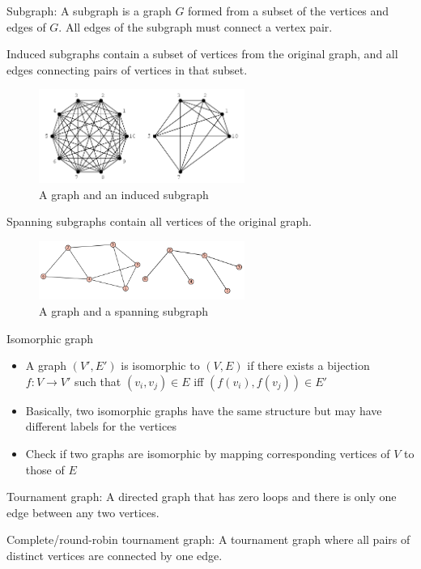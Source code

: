 \documentclass{article}
\begin{document}
Subgraph: A subgraph is a graph $G$ formed from a subset of the vertices and edges of $G$. All edges of the subgraph must connect a vertex pair.

Induced subgraphs contain a subset of vertices from the original graph, and all edges connecting pairs of vertices in that subset.

\begin{figure}[htb]
    \caption{A graph and an induced subgraph}
    \centering
    \includegraphics[width=0.6\textwidth]{InducedSubgraph_900.png}
\end{figure}

Spanning subgraphs contain all vertices of the original graph.

\begin{figure}[htb]
    \caption{A graph and a spanning subgraph}
    \centering
    \includegraphics[width=0.6\textwidth]{fig-subgraphs.png}
\end{figure}

Isomorphic graph

\begin{itemize}
    \item A graph $(V', E')$ is isomorphic to $(V, E)$ if there exists a bijection $f: V \rightarrow V'$ such that $(v_i, v_j) \in E$ iff $(f(v_i), f(v_j)) \in E'$
    \item Basically, two isomorphic graphs have the same structure but may have different labels for the vertices
    \item Check if two graphs are isomorphic by mapping corresponding vertices of $V$ to those of $E$
\end{itemize}

Tournament graph: A directed graph that has zero loops and there is only one edge between any two vertices.

Complete/round-robin tournament graph: A tournament graph where all pairs of distinct vertices are connected by one edge.
\end{document}
